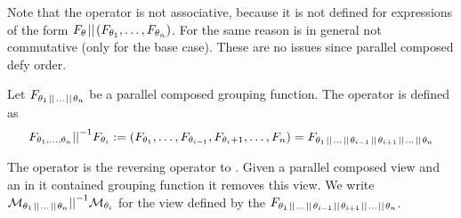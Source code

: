 \documentclass[preview]{standalone}
\begin{document}
%
%

Note that the operator \pll is not associative, because it is not defined for expressions of the form $\grpfct[\viewppty] \pll (\grpfct[\viewppty_1], \dots, \grpfct[\viewppty_n])$. For the same reason \pll is in general not commutative (only for the base case). These are no issues since parallel composed \grpfctsN defy order. 

\begin{definition}
	Let $\grpfct[\viewppty_1 \pll \dots \pll \viewppty_n]$ be a parallel composed grouping function. The operator \pllrev is defined as
	\[
	\grpfct[\viewppty_1, \dots, \viewppty_n] \pllrev \grpfct[\viewppty_i] := (\grpfct[\viewppty_1], \dots, \grpfct[\viewppty_{i-1}],\grpfct[\viewppty_i+1], \dots, \grpfct[n]) = \grpfct[\viewppty_1 \pll \dots \pll \viewppty_{i-1} \pll \viewppty_{i+1} \pll \dots \pll \viewppty_n]
	\]
\end{definition}

The operator \pllrev is the reversing operator to \pll. Given a parallel composed view and an in it contained grouping function it removes this view. We write $\view[\viewppty_1 \pll \dots \pll \viewppty_n] \pllrev \view[\viewppty_i]$ for the view defined by the \grpfctN $\grpfct[\viewppty_1 \pll \dots \pll \viewppty_{i-1} \pll \viewppty_{i+1} \pll \dots \pll \viewppty_n]$.
\end{document}
